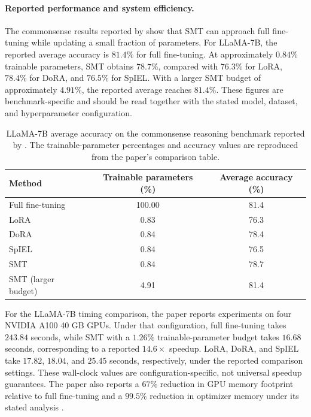 \paragraph{Reported performance and system efficiency.}
The commonsense results reported by \textcite{he2025smt} show that SMT can
approach full fine-tuning while updating a small fraction of parameters.
For LLaMA-7B, the reported average accuracy is $81.4\%$ for full fine-tuning.
At approximately $0.84\%$ trainable parameters, SMT obtains $78.7\%$,
compared with $76.3\%$ for LoRA, $78.4\%$ for DoRA, and $76.5\%$ for SpIEL.
With a larger SMT budget of approximately $4.91\%$, the reported average
reaches $81.4\%$. These figures are benchmark-specific and should be read
together with the stated model, dataset, and hyperparameter configuration.

\begin{table}[htbp]
    \centering
    \caption{LLaMA-7B average accuracy on the commonsense reasoning
    benchmark reported by \textcite{he2025smt}. The trainable-parameter
    percentages and accuracy values are reproduced from the paper's
    comparison table.}
    \label{tab:smt-commonsense-results}
    \begin{tabularx}{\textwidth}{lcc}
        \toprule
        Method & Trainable parameters (\%) & Average accuracy (\%) \\
        \midrule
        Full fine-tuning & 100.00 & 81.4 \\
        LoRA & 0.83 & 76.3 \\
        DoRA & 0.84 & 78.4 \\
        SpIEL & 0.84 & 76.5 \\
        SMT & 0.84 & 78.7 \\
        SMT (larger budget) & 4.91 & 81.4 \\
        \bottomrule
    \end{tabularx}
\end{table}

For the LLaMA-7B timing comparison, the paper reports experiments on four
NVIDIA A100 40 GB GPUs. Under that configuration, full fine-tuning takes
$243.84$ seconds, while SMT with a $1.26\%$ trainable-parameter budget takes
$16.68$ seconds, corresponding to a reported $14.6\times$ speedup. LoRA,
DoRA, and SpIEL take $17.82$, $18.04$, and $25.45$ seconds, respectively,
under the reported comparison settings. These wall-clock values are
configuration-specific, not universal speedup guarantees. The paper also
reports a $67\%$ reduction in GPU memory footprint relative to full
fine-tuning and a $99.5\%$ reduction in optimizer memory under its stated
analysis \parencite{he2025smt}.

